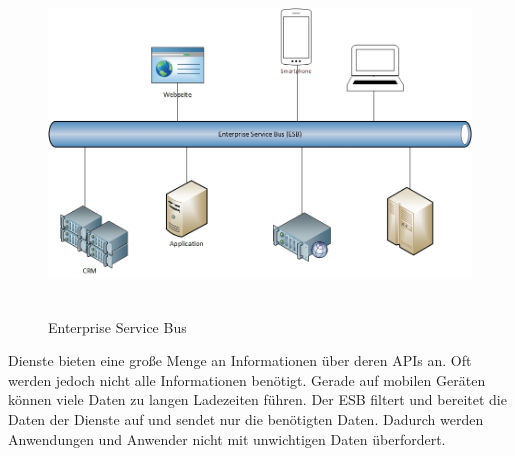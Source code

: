 \begin{figure}[htb]
    \centering 
    \includegraphics[width=\linewidth]{content/images/ESB}\
    \caption[ESB]{Enterprise Service Bus}
    \label{fig:esb}  
\end{figure}
\newpage
Dienste bieten eine große Menge an Informationen über deren APIs an. Oft werden jedoch nicht alle Informationen benötigt. Gerade auf mobilen Geräten können viele Daten zu langen Ladezeiten führen. Der ESB filtert und bereitet die Daten der Dienste auf und sendet nur die benötigten Daten. Dadurch werden Anwendungen und Anwender nicht mit unwichtigen Daten überfordert.